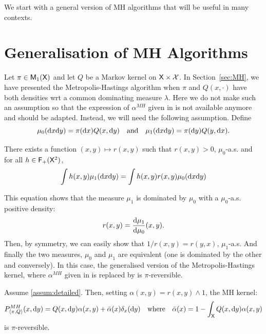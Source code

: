 \documentclass[english,graybox,envcountchap,envcountsame,sectrefs,shortlabels]{svmono}
\theoremstyle{style}
\newenvironment{hyp}[1]{
\begin{enumerate}[label=(\textbf{\sf #1}\arabic*),resume=hyp#1]\begin{sf}}
{\end{sf}\end{enumerate}}
\begin{document}
We start with a general version of MH algorithms that will be useful in many contexts.
\section{Generalisation of MH Algorithms}
\label{sec:gener}
Let $\pi\in\mathsf{M}_{1}(\mathsf{X})$ and let $Q$ be a Markov kernel on $\mathsf{X} \times\mathcal{X}$. In Section~\ref{sec:MH}, we have presented the Metropolis-Hastings algorithm when $\pi$ and $Q(x,\cdot)$ have both densities wrt a common dominating measure $\lambda$. Here we do not make such an assumption so that the expression of $\alpha^{MH}$ given in  is not available anymore and should be adapted. Instead, we will need the following assumption. Define
$$
\mu_0(\mathrm{d} x \mathrm{d} y)=\pi(\mathrm{d} x) Q(x,\mathrm{d} y)\quad \mbox{and} \quad \mu_1(\mathrm{d} x \mathrm{d} y)=\pi(\mathrm{d} y) Q(y,\mathrm{d} x).
$$
\begin{shaded}
\begin{hyp}{B}
\item \label{assum:detailed}  There exists a function $(x,y)\mapsto r(x,y)$ such that $r(x,y)>0$, $\mu_0$-a.s. and for all $h\in \mathsf{F_{+}}(\mathsf{X}^2)$,
\begin{equation}
\label{eq:detailed}
\int h(x,y)\mu_1(\mathrm{d} x\mathrm{d} y)=\int h(x,y) r(x,y)\mu_0(\mathrm{d} x\mathrm{d} y)
\end{equation}
\end{hyp}

\end{shaded}


This equation shows that the measure $\mu_1$ is dominated by $\mu_0$ with a $\mu_0$-a.s. positive density: 
$$
r(x,y)=\frac{\mathrm{d} \mu_1}{\mathrm{d} \mu_0}(x,y).
$$ 
Then, by symmetry, we can easily show that $1/r(x,y)=r(y,x)$, $\mu_1$-a.s. And finally the two measures, $\mu_0$ and $\mu_1$ are equivalent (one is dominated by the other and conversely). In this case, the generalised version of the Metropolis-Hastings kernel, where $\alpha^{MH}$ given in  is replaced by  is $\pi$-reversible.
\begin{framed}
\begin{lemma} \label{lem:generalMH}
Assume \ref{assum:detailed}. Then, setting $\alpha(x,y)=r(x,y) \wedge 1$, the MH kernel:
$$
P_{\langle\pi,Q\rangle}^{MH}(x,\mathrm{d} y)=Q(x,\mathrm{d} y)\alpha(x,y)+\bar{\alpha}(x)\delta_{x}(\mathrm{d} y) \quad \mbox{where} \quad \bar \alpha(x)=1-\int_{\mathsf{X}} Q(x,\mathrm{d} y)\alpha(x,y)
$$
is $\pi$-reversible.
\end{lemma}
\end{framed}
\end{document}
